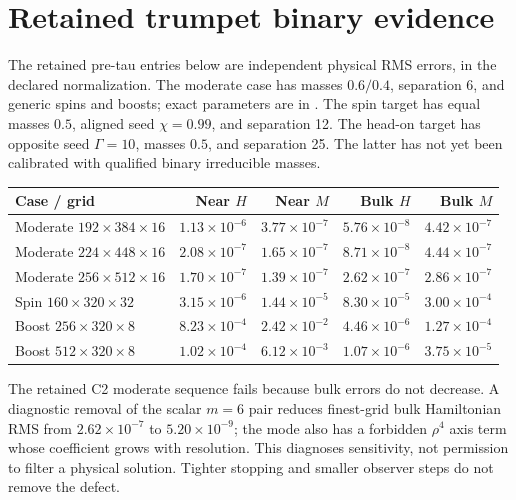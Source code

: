 \documentclass[aps,prd,preprint,notitlepage,nofootinbib]{revtex4-2}
\begin{document}
\section{Retained trumpet binary evidence}
The retained pre-tau entries below are independent physical RMS errors, in the declared
normalization. The moderate case has masses $0.6/0.4$, separation 6, and generic
spins and boosts; exact parameters are in .
The spin target has equal masses $0.5$, aligned seed $\chi=0.99$, and separation
12. The head-on target has opposite seed $\Gamma=10$, masses $0.5$, and
separation 25. The latter has not yet been calibrated with qualified binary
irreducible masses.
\begin{center}\footnotesize
\begin{tabular}{@{}lrrrr@{}}
\toprule
Case / grid & Near $H$ & Near $M$ & Bulk $H$ & Bulk $M$\\\midrule
Moderate $192\!\times\!384\!\times\!16$ & $1.13\times10^{-6}$ & $3.77\times10^{-7}$ & $5.76\times10^{-8}$ & $4.42\times10^{-7}$\\
Moderate $224\!\times\!448\!\times\!16$ & $2.08\times10^{-7}$ & $1.65\times10^{-7}$ & $8.71\times10^{-8}$ & $4.44\times10^{-7}$\\
Moderate $256\!\times\!512\!\times\!16$ & $1.70\times10^{-7}$ & $1.39\times10^{-7}$ & $2.62\times10^{-7}$ & $2.86\times10^{-7}$\\
Spin $160\!\times\!320\!\times\!32$ & $3.15\times10^{-6}$ & $1.44\times10^{-5}$ & $8.30\times10^{-5}$ & $3.00\times10^{-4}$\\
Boost $256\!\times\!320\!\times\!8$ & $8.23\times10^{-4}$ & $2.42\times10^{-2}$ & $4.46\times10^{-6}$ & $1.27\times10^{-4}$\\
Boost $512\!\times\!320\!\times\!8$ & $1.02\times10^{-4}$ & $6.12\times10^{-3}$ & $1.07\times10^{-6}$ & $3.75\times10^{-5}$\\
\bottomrule
\end{tabular}
\end{center}
The retained C2 moderate sequence fails because bulk errors do not decrease.
A diagnostic removal of the scalar $m=6$ pair reduces finest-grid bulk
Hamiltonian RMS from $2.62\times10^{-7}$ to $5.20\times10^{-9}$; the mode also
has a forbidden $\rho^4$ axis term whose coefficient grows with resolution.
This diagnoses sensitivity, not permission to filter a physical solution.
Tighter stopping and smaller observer steps do not remove the defect.
\end{document}
